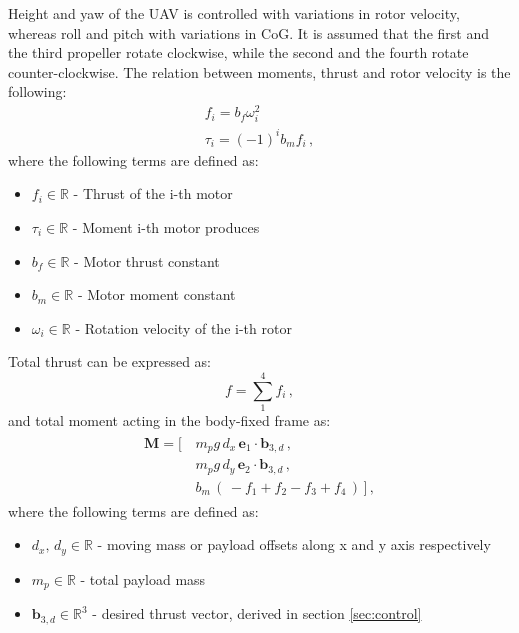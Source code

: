 \indent Height and yaw of the UAV is controlled with variations in rotor velocity, whereas roll and pitch with variations in CoG. It is assumed that the first and the third propeller rotate clockwise, while the second and the fourth rotate counter-clockwise. The relation between moments, thrust and rotor velocity is the following:
\begin{gather}
	f_i = b_f \omega_{i}^2 \label{force}\\
	\tau_i = (-1)^i b_m f_i \, ,
\end{gather}
where the following terms are defined as:
\begin{itemize}
	\item $f_i \in \mathbb{R}$ - Thrust of the i-th motor
	
	\item $\tau_i \in \mathbb{R}$ - Moment i-th motor produces
	
	\item $b_f \in \mathbb{R}$ - Motor thrust constant
	
	\item $b_m \in \mathbb{R}$ - Motor moment constant
	
	\item $\omega_i \in \mathbb{R}$ - Rotation velocity of the i-th rotor
\end{itemize}
Total thrust can be expressed as:
\begin{equation}
	f = \sum_{1}^{4}f_i \, , \label{control:f}
\end{equation}
and total moment acting in the body-fixed frame as:
\begin{align}
	\begin{split} \label{control:M}
	\textbf{M} = [\, &m_{p}g \, d_x \, \textbf{e}_1 \cdot \textbf{b}_{3,d} \,, \\
	&m_{p}g \, d_y \, \textbf{e}_2 \cdot \textbf{b}_{3,d} \,, \\
	&b_m \,(\, -f_1 + f_2 - f_3 + f_4 \,)\, ] \, ,
	\end{split}
\end{align}
where the following terms are defined as: 
\begin{itemize}
	\item $d_x,\, d_y \in \mathbb{R}$ - moving mass or payload offsets along x and y axis respectively
	\item $m_p \in \mathbb{R}$ - total payload mass 
	\item $\textbf{b}_{3,d} \in \mathbb{R}^3$ - desired thrust vector, derived in section \ref{sec:control} 
\end{itemize}
